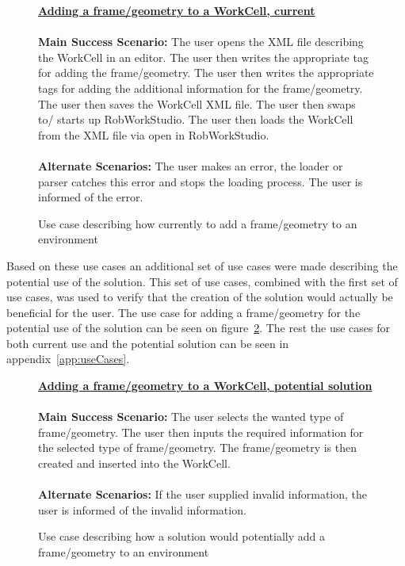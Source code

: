 \begin{figure}
\begin{framed}
\underline{\textbf{Adding a frame/geometry to a WorkCell, current}}\\\\
\textbf{Main Success Scenario:} The user opens the XML file describing the WorkCell in an editor. The user then writes the appropriate tag for adding the frame/geometry. The user then writes the appropriate tags for adding the additional information for the frame/geometry. The user then saves the WorkCell XML file. The user then swaps to/ starts up RobWorkStudio. The user then loads the WorkCell from the XML file via open in RobWorkStudio.\\\\
\textbf{Alternate Scenarios:} The user makes an error, the loader or parser catches this error and stops the loading process. The user is informed of the error.
\end{framed}
\caption{Use case describing how currently to add a frame/geometry to an environment}
\label{fig:currentUseCase}
\end{figure}

Based on these use cases an additional set of use cases were made describing the potential use of the solution. This set of use cases, combined with the first set of use cases, was used to verify that the creation of the solution would actually be beneficial for the user. The use case for adding a frame/geometry for the potential use of the solution can be seen on figure~\ref{fig:pluginUseCase}. The rest the use cases for both current use and the potential solution can be seen in appendix~\ref{app:useCases}.

\begin{figure}
\begin{framed}
\underline{\textbf{Adding a frame/geometry to a WorkCell, potential solution}}\\\\
\textbf{Main Success Scenario:} The user selects the wanted type of frame/geometry. The user then inputs the required information for the selected type of frame/geometry. The frame/geometry is then created and inserted into the WorkCell.\\\\
\textbf{Alternate Scenarios:} If the user supplied invalid information, the user is informed of the invalid information.
\end{framed}
\caption{Use case describing how a solution would potentially add a frame/geometry to an environment}
\label{fig:pluginUseCase}
\end{figure}

